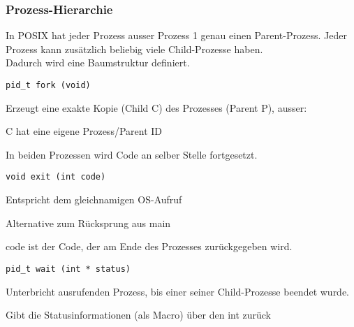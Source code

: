 \begin{multicols*}{5}
	 \vspace{-7pt}
	\subsubsection{Prozess-Hierarchie}
		In POSIX hat jeder Prozess ausser Prozess 1 genau einen Parent-Prozess. Jeder Prozess kann zusätzlich beliebig viele Child-Prozesse haben.\\
		Dadurch wird eine Baumstruktur definiert. 


		\vspace{-5pt}
		\begin{lstlisting}
pid_t fork (void)
		\end{lstlisting}
		\vspace{-5pt}
		\begin{compactitem}[$\bullet$]
			\item Erzeugt eine exakte Kopie (Child C) des Prozesses (Parent P), ausser:
			\item C hat eine eigene Prozess/Parent ID
			\item In beiden Prozessen wird Code an selber Stelle fortgesetzt.
		\end{compactitem}
		
		\vspace{-5pt}
	
		\begin{lstlisting}
void exit (int code)
		\end{lstlisting}
		\vspace{-5pt}
		\begin{compactitem}[$\bullet$]
			\item Entspricht dem gleichnamigen OS-Aufruf
			\item Alternative zum Rücksprung aus main
			\item code ist der Code, der am Ende des Prozesses zurückgegeben wird.
		\end{compactitem}
		
		\vspace{-5pt}

		\begin{lstlisting}
pid_t wait (int * status)
		\end{lstlisting}
		\vspace{-5pt}
		\begin{compactitem}[$\bullet$]
			\item Unterbricht ausrufenden Prozess, bis einer seiner Child-Prozesse beendet wurde.
			\item Gibt die Statusinformationen (als Macro) über den int zurück
		\end{compactitem}
		

\end{multicols*}
